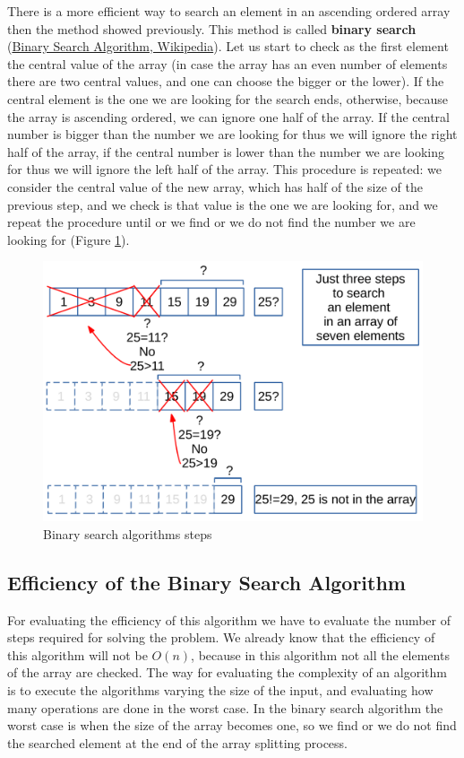 There is a more efficient way to search an element in an ascending ordered array then the method showed previously. This method is called \textbf{binary search} \cite{wikibinarysearch} (\href{https://en.wikipedia.org/wiki/Binary_search_algorithm}{Binary Search Algorithm, Wikipedia}).
Let us start to check as the first element the central value of the array (in case the array has an even number of elements there are two central values, and one can choose the bigger or the lower). If the central element is the one we are looking for the search ends, otherwise, because the array is ascending ordered, we can ignore one half of the array. If the central number is bigger than the number we are looking for thus we will ignore the right half of the array, if the central number is lower than the number we are looking for thus we will ignore the left half of the array. This procedure is repeated: we consider the central value of the new array, which has half of the size of the previous step, and we check is that value is the one we are looking for, and we repeat the procedure until or we find or we do not find the number we are looking for (Figure \ref{sorting_2}). 

\begin{figure}[H]
	\begin{center}
		\includegraphics[scale=.6]{chapters/searchandsorting/images/sorting_2.pdf}
		\caption[Binary search algorithms steps]{Binary search algorithms steps}
		\label{sorting_2}
	\end{center}
\end{figure}

\subsection{Efficiency of the Binary Search Algorithm}
For evaluating the efficiency of this algorithm we have to evaluate the number of steps required for solving the problem. We already know that the efficiency of this algorithm will not be \(O(n)\), because in this algorithm not all the elements of the array are checked. The way for evaluating the complexity of an algorithm is to execute the algorithms varying the size of the input, and evaluating how many operations are done in the worst case. In the binary search algorithm the worst case is when the size of the array becomes one, so we find or we do not find the searched element at the end of the array splitting process.

